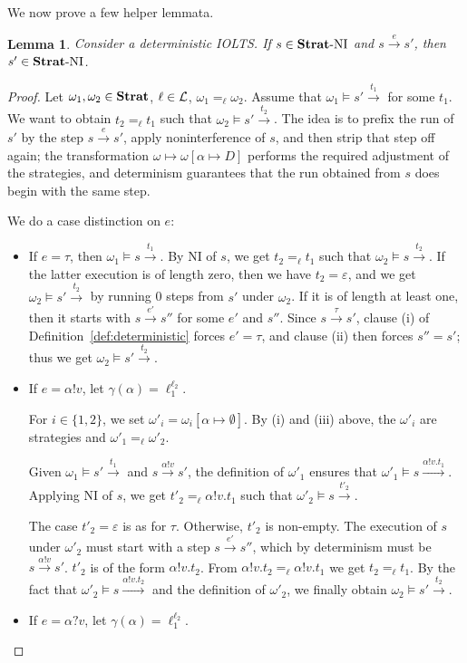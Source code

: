 \documentclass[preprint,5p,twocolumn]{elsarticle}
\newtheorem{lemma}[theorem]{Lemma}
\begin{document}
We now prove a few helper lemmata.
\begin{lemma}
  \label{thm:deterministic step}
  Consider a deterministic IOLTS. If $s \in \mathbf{Strat}\text{-}\mathrm{NI}$ and $s \xrightarrow{e} s'$, then
  $s' \in \mathbf{Strat}\text{-}\mathrm{NI}$.
\end{lemma}
\begin{proof}
  Let $\omega_1, \omega_2 \in \mathbf{Strat}$, $\ell \in \mathcal{L}$, $\omega_1 =_\ell \omega_2$.
  Assume that $\omega_1 \vDash s' \xrightarrow{t_1}$ for some $t_1$. We want to obtain
  $t_2 =_\ell t_1$ such that  $\omega_2 \vDash s' \xrightarrow{t_2}$. The idea is to prefix the run
  of $s'$ by the step $s \xrightarrow{e} s'$, apply noninterference of $s$, and then strip that step
  off again; the transformation $\omega \mapsto \omega[\alpha \mapsto D]$ performs the required
  adjustment of the strategies, and determinism guarantees that the run obtained from $s$ does
  begin with the same step.

  We do a case distinction on $e$:
  \begin{itemize}
  \item If $e = \tau$, then $\omega_1 \vDash s \xrightarrow{t_1}$. By NI of $s$, we get $t_2 =_\ell t_1$
    such that $\omega_2 \vDash s \xrightarrow{t_2}$. If the latter execution is of length zero, then we have
    $t_2 = \varepsilon$, and we get $\omega_2 \vDash s' \xrightarrow{t_2}$ by running 0 steps from $s'$
    under $\omega_2$. If it is of length at least one, then it starts with $s \xrightarrow{e'} s''$ for some $e'$
    and $s''$. Since $s \xrightarrow{\tau} s'$, clause (i) of Definition~\ref{def:deterministic}
    forces $e' = \tau$, and clause (ii) then forces $s'' = s'$; thus we get
    $\omega_2 \vDash s' \xrightarrow{t_2}$.
  \item If $e = \alpha ! v$, let $\gamma(\alpha) = \ell_1^{\ell_2}$.

    For $i \in \{1,2\}$, we set $\omega'_i = \omega_i[\alpha \mapsto \emptyset]$. By (i) and (iii)
    above, the $\omega'_i$ are strategies and $\omega'_1 =_\ell \omega'_2$.

    Given $\omega_1 \vDash s' \xrightarrow{t_1}$ and $s \xrightarrow{\alpha!v} s'$, the definition of $\omega'_1$
    ensures that $\omega'_1 \vDash s \xrightarrow{\alpha!v.t_1}$.  
    Applying NI of $s$, we get $t'_2 =_\ell \alpha!v.t_1$ such that $\omega'_2 \vDash s \xrightarrow{t'_2}$.
    
    The case $t'_2 = \varepsilon$ is as for $\tau$. 
    Otherwise, $t'_2$ is non-empty. The execution
    of $s$ under $\omega'_2$ must start with a step $s \xrightarrow{e'} s''$, which by determinism must
    be $s \xrightarrow{\alpha!v} s'$. $t'_2$ is of the form $\alpha ! v.t_2$. From $\alpha!v.t_2 =_\ell \alpha!v.t_1$
    we get $t_2 =_\ell t_1$. By the fact that $\omega'_2 \vDash s \xrightarrow{\alpha!v.t_2}$ and the definition
    of $\omega'_2$, we finally obtain $\omega_2 \vDash s' \xrightarrow{t_2}$.
  \item If $e = \alpha ? v$, let $\gamma(\alpha) = \ell_1^{\ell_2}$.


\end{itemize}
\end{proof}
\end{document}
